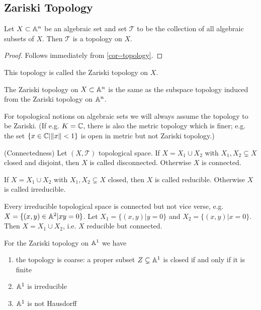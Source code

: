 \documentclass[a4paper,11pt]{article}
\begin{document}
		\subsection{Zariski Topology}

			\begin{prop}
				Let $X\subset\AA^n$ be an algebraic set and set $\mathcal{T}$ to be the collection of all algebraic subsets of $X$. Then $\mathcal{T}$ is a topology on $X$.
			\end{prop}
			\begin{proof}
				Follows immediately from \autoref{cor--topology}.
			\end{proof}

			This topology is called the Zariski topology on $X$.

			\begin{remark}
				The Zariski topology on $X\subset\AA^n$ is the same as the subspace topology induced from the Zariski topology on $\AA^n$.
			\end{remark}

			\begin{remark}
				For topological notions on algebraic sets we will always assume the topology to be Zariski. (If e.g. $K=\CC$, there is also the metric topology which is finer; e.g. the set $\{x\in\CC|\norm{x}<1\}$ is open in metric but not Zariski topology.)
			\end{remark}

			\begin{defi}(Connectedness)
				Let $(X,\mathcal{T})$ topological space. If $X=X_1\cup X_2$ with $X_1,X_2\subsetneq X$ closed and disjoint, then $X$ is called disconnected. Otherwise $X$ is connected.
			\end{defi}

			\begin{defi}
				If $X=X_1\cup X_2$ with $X_1,X_2\subsetneq X$ closed, then $X$ is called reducible. Otherwise $X$ is called irreducible.
			\end{defi}

			Every irreducible topological space is connected but not vice verse, e.g. $X=\{(x,y)\in\AA^2|xy=0\}$. Let $X_1=\{(x,y)|y=0\}$ and $X_2=\{(x,y)|x=0\}$. Then $X=X_1\cup X_2$, i.e. $X$ reducible but connected.

			\begin{pro}
				For the Zariski topology on $\AA^1$ we have
				\begin{enumerate}
					\item the topology is coarse: a proper subset $Z\subsetneq\AA^1$ is closed if and only if it is finite
					\item $\AA^1$ is irreducible
					\item $\AA^1$ is not Hausdorff
				\end{enumerate} 
			\end{pro}
\end{document}
